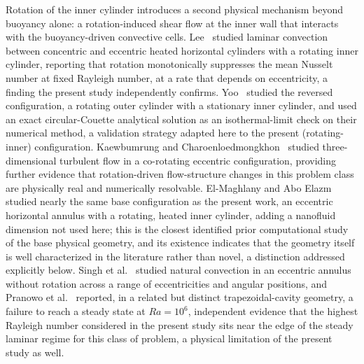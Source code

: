 Rotation of the inner cylinder introduces a second physical mechanism beyond buoyancy alone: a rotation-induced shear flow at the inner wall that interacts with the buoyancy-driven convective cells. Lee~\cite{Lee1992a,Lee1992b} studied laminar convection between concentric and eccentric heated horizontal cylinders with a rotating inner cylinder, reporting that rotation monotonically suppresses the mean Nusselt number at fixed Rayleigh number, at a rate that depends on eccentricity, a finding the present study independently confirms. Yoo~\cite{Yoo1998} studied the reversed configuration, a rotating outer cylinder with a stationary inner cylinder, and used an exact circular-Couette analytical solution as an isothermal-limit check on their numerical method, a validation strategy adapted here to the present (rotating-inner) configuration. Kaewbumrung and Charoenloedmongkhon~\cite{Kaewbumrung2022} studied three-dimensional turbulent flow in a co-rotating eccentric configuration, providing further evidence that rotation-driven flow-structure changes in this problem class are physically real and numerically resolvable. El-Maghlany and Abo Elazm~\cite{ElMaghlany2016} studied nearly the same base configuration as the present work, an eccentric horizontal annulus with a rotating, heated inner cylinder, adding a nanofluid dimension not used here; this is the closest identified prior computational study of the base physical geometry, and its existence indicates that the geometry itself is well characterized in the literature rather than novel, a distinction addressed explicitly below. Singh et al.~\cite{Singh2024} studied natural convection in an eccentric annulus without rotation across a range of eccentricities and angular positions, and Pranowo et al.~\cite{Pranowo2024} reported, in a related but distinct trapezoidal-cavity geometry, a failure to reach a steady state at $Ra=10^6$, independent evidence that the highest Rayleigh number considered in the present study sits near the edge of the steady laminar regime for this class of problem, a physical limitation of the present study as well.

